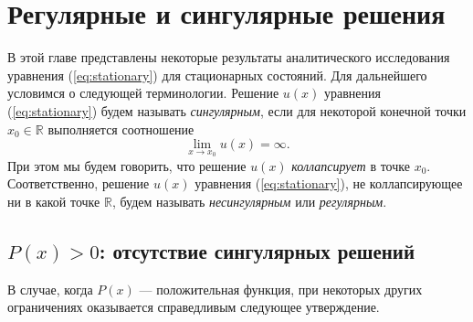 \chapter{Регулярные и сингулярные решения}

В этой главе представлены некоторые результаты аналитического исследования уравнения (\ref{eq:stationary}) для стационарных состояний.
Для дальнейшего условимся о следующей терминологии.
Решение $u(x)$ уравнения (\ref{eq:stationary}) будем называть {\it сингулярным}, если для некоторой конечной точки $x_0 \in \mathbb{R}$ выполняется соотношение
%
$$\lim \limits_{x \to x_0} u(x) = \infty.$$
%
При этом мы будем говорить, что решение $u(x)$ {\it коллапсирует} в точке $x_0$.
Соответственно, решение $u(x)$ уравнения (\ref{eq:stationary}), не коллапсирующее ни в какой точке $\mathbb{R}$, будем называть {\it несингулярным} или {\it регулярным}.

\section{$P(x) > 0$: отсутствие сингулярных решений}

В случае, когда $P(x)$ --- положительная функция, при некоторых других ограничениях оказывается справедливым следующее утверждение.

